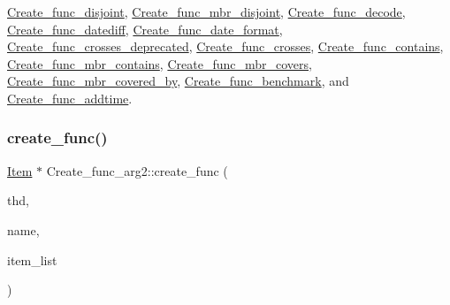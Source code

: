 \mbox{\hyperlink{classCreate__func__disjoint_a0639f3a4f011700c1d7615f2fc8447f4}{Create\+\_\+func\+\_\+disjoint}}, \mbox{\hyperlink{classCreate__func__mbr__disjoint_a3971391651f94d51ae53d7caf6b5d695}{Create\+\_\+func\+\_\+mbr\+\_\+disjoint}}, \mbox{\hyperlink{classCreate__func__decode_a27cc797ca32862ac06c75fa68ce8c6d0}{Create\+\_\+func\+\_\+decode}}, \mbox{\hyperlink{classCreate__func__datediff_ac305bdb9383ac4ba449deba308fc8363}{Create\+\_\+func\+\_\+datediff}}, \mbox{\hyperlink{classCreate__func__date__format_a7ddf54877caaf07070cbf8804cdd0b6e}{Create\+\_\+func\+\_\+date\+\_\+format}}, \mbox{\hyperlink{classCreate__func__crosses__deprecated_a8b25bef9fe289b89661b54d116c98adf}{Create\+\_\+func\+\_\+crosses\+\_\+deprecated}}, \mbox{\hyperlink{classCreate__func__crosses_a6e70127aa142416341cc918ecffe11a5}{Create\+\_\+func\+\_\+crosses}}, \mbox{\hyperlink{classCreate__func__contains_aa892f88fe4b3821738131902af24efa9}{Create\+\_\+func\+\_\+contains}}, \mbox{\hyperlink{classCreate__func__mbr__contains_a609e085bb6561bf8189b982376583b08}{Create\+\_\+func\+\_\+mbr\+\_\+contains}}, \mbox{\hyperlink{classCreate__func__mbr__covers_adc053114bd89549633f1186e41652938}{Create\+\_\+func\+\_\+mbr\+\_\+covers}}, \mbox{\hyperlink{classCreate__func__mbr__covered__by_a5ac25291a7a9530a72a191555643d8a5}{Create\+\_\+func\+\_\+mbr\+\_\+covered\+\_\+by}}, \mbox{\hyperlink{classCreate__func__benchmark_acb85d1eecc34e6050847c6d6f1016d4b}{Create\+\_\+func\+\_\+benchmark}}, and \mbox{\hyperlink{classCreate__func__addtime_aa42159a31d1c799d27c6f8ddc7208f6c}{Create\+\_\+func\+\_\+addtime}}.

\mbox{\label{classCreate__func__arg2_af00a3acb69525f4aee007ef21ca43e30}} 
\subsubsection{\texorpdfstring{create\+\_\+func()}{create\_func()}}
{\footnotesize\ttfamily \mbox{\hyperlink{classItem}{Item}} $\ast$ Create\+\_\+func\+\_\+arg2\+::create\+\_\+func (\begin{DoxyParamCaption}\item[{T\+HD $\ast$}]{thd,  }\item[{L\+E\+X\+\_\+\+S\+T\+R\+I\+NG}]{name,  }\item[{\mbox{\hyperlink{classPT__item__list}{P\+T\+\_\+item\+\_\+list}} $\ast$}]{item\+\_\+list }\end{DoxyParamCaption})\hspace{0.3cm}{\ttfamily [virtual]}}


